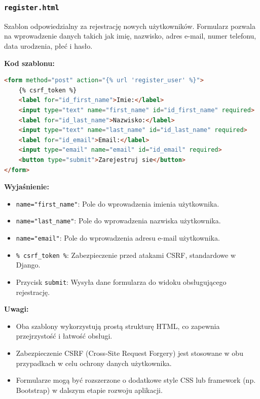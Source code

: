 \documentclass[12pt,a4paper,oneside]{article}
\theoremstyle{definition}
\numberwithin{equation}{section}
\begin{document}
\subsubsection*{\texttt{register.html}}
\label{sec:register_template}

Szablon odpowiedzialny za rejestrację nowych użytkowników. Formularz pozwala na wprowadzenie danych takich jak imię, nazwisko, adres e-mail, numer telefonu, data urodzenia, płeć i hasło.

\textbf{Kod szablonu:}
\begin{lstlisting}[language=HTML, caption=Szablon register.html]
<form method="post" action="{% url 'register_user' %}">
    {% csrf_token %}
    <label for="id_first_name">Imie:</label>
    <input type="text" name="first_name" id="id_first_name" required>
    <label for="id_last_name">Nazwisko:</label>
    <input type="text" name="last_name" id="id_last_name" required>
    <label for="id_email">Email:</label>
    <input type="email" name="email" id="id_email" required>
    <button type="submit">Zarejestruj sie</button>
</form>
\end{lstlisting}

\textbf{Wyjaśnienie:}
\begin{itemize}
    \item \texttt{name="first\_name"}: Pole do wprowadzenia imienia użytkownika.
    \item \texttt{name="last\_name"}: Pole do wprowadzenia nazwiska użytkownika.
    \item \texttt{name="email"}: Pole do wprowadzenia adresu e-mail użytkownika.
    \item \texttt{{\% csrf\_token \%}}: Zabezpieczenie przed atakami CSRF, standardowe w Django.
    \item Przycisk \texttt{submit}: Wysyła dane formularza do widoku obsługującego rejestrację.
\end{itemize}

\textbf{Uwagi:}
\begin{itemize}
    \item Oba szablony wykorzystują prostą strukturę HTML, co zapewnia przejrzystość i łatwość obsługi.
    \item Zabezpieczenie CSRF (Cross-Site Request Forgery) jest stosowane w obu przypadkach w celu ochrony danych użytkownika.
    \item Formularze mogą być rozszerzone o dodatkowe style CSS lub framework (np. Bootstrap) w dalszym etapie rozwoju aplikacji.
\end{itemize}
\end{document}
